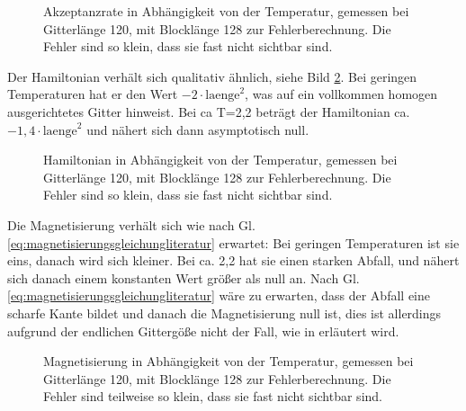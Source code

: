\documentclass{scrreprt}
\begin{document}
	\begin{figure}[htbp]
		
		\caption[Akzeptanzrate in Abhängigkeit von der Temperatur]{Akzeptanzrate in Abhängigkeit von der Temperatur, gemessen bei Gitterlänge 120, mit Blocklänge 128 zur Fehlerberechnung. Die Fehler sind so klein, dass sie fast nicht sichtbar sind.}
		\label{fig:ergebnisakzeptanzrate}
	\end{figure}
	
	Der Hamiltonian verhält sich qualitativ ähnlich, siehe Bild \ref{fig:ergebnishamiltonian}. Bei geringen Temperaturen hat er den Wert $-2\cdot\text{laenge}^2$, was auf ein vollkommen homogen ausgerichtetes Gitter hinweist. Bei ca T=2,2 beträgt der Hamiltonian ca. $-1,4\cdot\text{laenge}^2$ und nähert sich dann asymptotisch null.
	
	\begin{figure}[htbp]
		
		\caption[Hamiltonian in Abhängigkeit von der Temperatur]{Hamiltonian in Abhängigkeit von der Temperatur, gemessen bei Gitterlänge 120, mit Blocklänge 128 zur Fehlerberechnung. Die Fehler sind so klein, dass sie fast nicht sichtbar sind.}
		\label{fig:ergebnishamiltonian}
	\end{figure}
	

	Die Magnetisierung verhält sich wie nach Gl. \ref{eq:magnetisierungsgleichungliteratur} erwartet: Bei geringen Temperaturen ist sie eins, danach wird sich kleiner. Bei ca. 2,2 hat sie einen starken Abfall, und nähert sich danach einem konstanten Wert größer als null an. Nach Gl. \ref{eq:magnetisierungsgleichungliteratur} wäre zu erwarten, dass der Abfall eine scharfe Kante bildet und danach die Magnetisierung null ist, dies ist allerdings aufgrund der endlichen Gittergöße nicht der Fall, wie in \cite[Abschnitt 2.3.3]{binderheermann} erläutert wird.

	
	\begin{figure}[htbp]
		
		\caption[Magnetisierung in Abhängigkeit von der Temperatur]{Magnetisierung in Abhängigkeit von der Temperatur, gemessen bei Gitterlänge 120, mit Blocklänge 128 zur Fehlerberechnung. Die Fehler sind teilweise so klein, dass sie fast nicht sichtbar sind.}
		\label{fig:ergebnismagnetisierung}
	\end{figure}	
	
\end{document}
